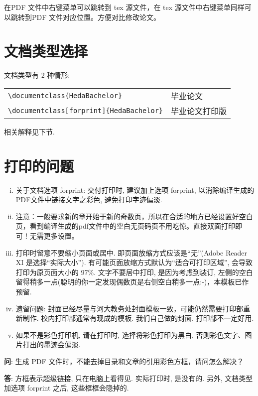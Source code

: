 \documentclass[forprint]{HedaBachelor}
\begin{document}
在PDF 文件中右键菜单可以跳转到 tex 源文件，在 tex 源文件中右键菜单同样可以跳转到PDF 文件对应位置。方便对比修改论文。


\section{文档类型选择}
文档类型有 2 种情形:

\begin{table}[ht]\centering {}
\begin{tabular}{ll}
\hline
   \verb|\documentclass{HedaBachelor}|                     &  毕业论文 \\
   \verb|\documentclass[forprint]{HedaBachelor}|        &  毕业论文打印版 \\
\hline
\end{tabular}
\end{table}
相关解释见下节.


\section{打印的问题}
\begin{enumerate}[i)]
  \item  关于文档选项 forprint: 交付打印时, 建议加上选项 forprint, 以消除编译生成的PDF文件中链接文字之彩色, 避免打印字迹偏淡.
  \item  注意：一般要求新的章开始于新的奇数页，所以在合适的地方已经设置好空白页，看到编译生成的pdf文件中的空白无页码页不用吃惊。直接双面打印即可！无需更多设置。
  \item  打印时留意不要缩小页面或居中. 即页面放缩方式应该是“无”(Adobe Reader XI 是选择“实际大小”).
           有可能页面放缩方式默认为``适合可打印区域'', 会导致打印为原页面大小的 $97\%$.
           文字不要居中打印, 是因为考虑到装订, 左侧的空白留得稍多一点(聪明的你一定发现偶数页是右侧空白稍多一点:-)，本模板已作预留.
  \item  遗留问题: 封面已经尽量与河大教务处封面模板一致，可能仍然需要打印部重新制作.  校内打印部通常有现成的模板. 我们自己做的封面, 打印部不一定好用.
  \item	如果不是彩色打印机, 请在打印时, 选择将彩色打印为黑白, 否则彩色文字、图片打出的墨迹会偏淡.
\end{enumerate}


\textbf{问}: {\kaishu 生成 PDF 文件时，不能去掉目录和文章的引用彩色方框，请问怎么解决？}

\textbf{答}: {\kaishu 方框表示超级链接, 只在电脑上看得见. 实际打印时, 是没有的. 另外, 文档类型加选项 forprint 之后, 这些框框会隐掉的. }
\end{document}
